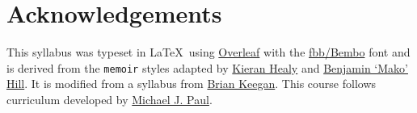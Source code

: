 \documentclass[10pt]{memoir}
\begin{document}
\section{\textbf{Acknowledgements}}

This syllabus was typeset in \LaTeX~using \href{http://www.sharelatex.com}{Overleaf} with the \href{http://www.tug.dk/FontCatalogue/fbb/}{fbb/Bembo} font and is derived from the \texttt{memoir} styles adapted by \href{https://github.com/kjhealy/latex-custom-kjh}{Kieran Healy} and \href{http://projects.mako.cc/source/?p=latex_mako;a=summary}{Benjamin `Mako' Hill}. It is modified from a syllabus from \href{https://www.brianckeegan.com/}{Brian Keegan}. This course follows curriculum developed by \href{https://cmci.colorado.edu/~mpaul/}{Michael J. Paul}.



\renewcommand{\bibsection}{\section{\huge \bibname}\prebibhook}
\baselineskip 14.2pt

\end{document}
